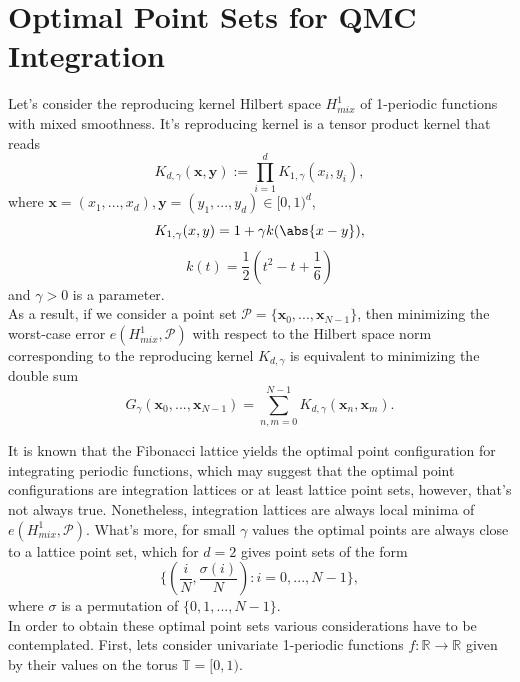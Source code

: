 \section{Optimal Point Sets for QMC Integration}

Let's consider the reproducing kernel Hilbert space $H_{mix}^1$ of 1-periodic functions with mixed smoothness. It's reproducing kernel is a tensor product kernel that reads
\begin{equation*}
    K_{d,\gamma}(\textbf{x},\textbf{y}) := \prod_{i=1}^{d} K_{1,\gamma}(x_i,y_i),
\end{equation*}
where $\textbf{x}=(x_1,...,x_d), \textbf{y}=(y_1,...,y_d)\in [0,1)^d$, 
\begin{equation*}
    K_{1,\gamma}(x,y) = 1 + \gamma k(\abs{x-y}),
\end{equation*}
\begin{equation*}
    k(t) = \frac{1}{2} (t^2 - t + \frac{1}{6})
\end{equation*}
and $\gamma > 0$ is a parameter. \\

As a result, if we consider a point set $\mathcal{P} = \{ \textbf{x}_0,...,\textbf{x}_{N-1} \}$, then minimizing the worst-case error $e(H_{mix}^1,\mathcal{P})$ with respect to the Hilbert space norm corresponding to the reproducing kernel $K_{d,\gamma}$ is equivalent to minimizing the double sum
\begin{equation*}
    G_{\gamma}(\textbf{x}_0,...,\textbf{x}_{N-1}) = \sum_{n,m=0}^{N-1} K_{d,\gamma}(\textbf{x}_n,\textbf{x}_m).
\end{equation*}

It is known that the Fibonacci lattice yields the optimal point configuration for integrating periodic functions, which may suggest that the optimal point configurations are integration lattices or at least lattice point sets, however, that's not always true. Nonetheless, integration lattices are always local minima of $e(H_{mix}^1,\mathcal{P})$. What's more, for small $\gamma$ values the optimal points are always close to a lattice point set, which for $d=2$ gives point sets of the form
\begin{equation*}
    \Bigg\{ \left(\frac{i}{N},\frac{\sigma(i)}{N}\right) : i=0,...,N-1 \Bigg\},
\end{equation*}
where $\sigma$ is a permutation of $\{ 0,1,...,N-1 \}$.\\


In order to obtain these optimal point sets various considerations have to be contemplated. First, lets consider univariate 1-periodic functions $f : \mathbb{R} \longrightarrow \mathbb{R}$ given by their values on the torus $\mathbb{T} = [0,1)$.\\


